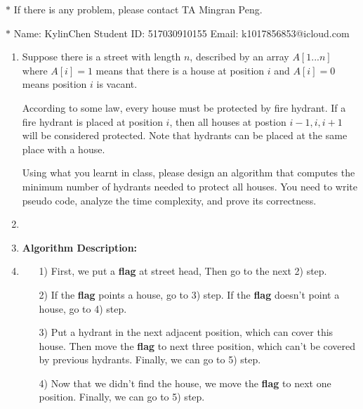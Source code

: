 \documentclass[12pt,a4paper]{article}
\makeatletter
\newtheorem*{solution}{Solution}
\theoremstyle{definition}
\renewenvironment{solution}[1][Solution] {\par\pushQED{\qed}\normalfont\topsep6\p@\@plus6\p@\relax\trivlist\item[\hskip\labelsep\bfseries#1\@addpunct{.}]\ignorespaces}{\popQED\endtrivlist\@endpefalse} \makeatother
\makeatother
\begin{document}
\noindent

\noindent{}


\begin{center}
\footnotesize{\color{red}$*$ If there is any problem, please contact TA Mingran Peng.}\par
\footnotesize{\color{blue}$*$ Name: KylinChen  \quad Student ID: 517030910155 \quad Email: k1017856853@icloud.com }
\end{center}
\begin{enumerate}
    \item
    Suppose there is a street with length $n$, described by an array $A[1...n]$ where $A[i]=1$ means that there is a house at position $i$ and $A[i]=0$ means position $i$ is vacant.\par
	According to some law, every house must be protected by fire hydrant. If a fire hydrant is placed at position $i$, then all houses at postion $i-1,i,i+1$ will be considered protected. Note that hydrants can be placed at the same place with a house.\par
	Using what you learnt in class, please design an algorithm that computes the minimum number of hydrants needed to protect all houses. You need to write pseudo code, analyze the time complexity,  and prove its correctness.\par
    \begin{solution}\item
    \renewcommand{\qedsymbol}{}
    \textbf{Algorithm Description:}
    \item
    \begin{itemize}
    \item [1)] First, we put a \textbf{flag} at street head, Then go to the next 2) step.
    \item [2)] If the \textbf{flag} points a house, go to 3) step. If the \textbf{flag} doesn't point a house, go to 4) step.
    \item [3)] Put a hydrant in the next adjacent position, which can cover this house. Then move the \textbf{flag} to next three position, which can't be covered by previous hydrants. Finally, we can go to 5) step.
    \item [4)] Now that we didn't find the house, we move the \textbf{flag} to next one position. Finally, we can go to 5) step.

\end{itemize}
\end{solution}
\end{enumerate}
\end{document}
